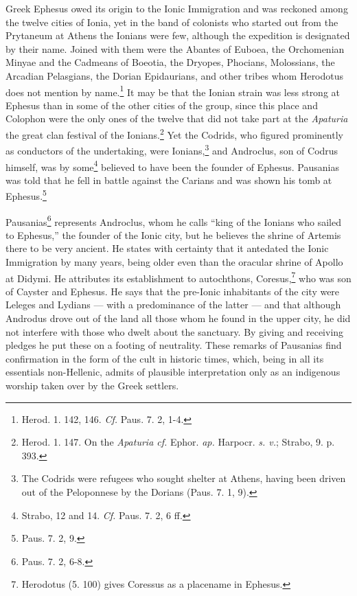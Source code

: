 \documentclass[a4paper, 12pt, oneside]{article}
\begin{document}
Greek Ephesus owed its origin to the Ionic Immigration and was reckoned among the twelve cities of Ionia, yet in the band of colonists who started out from the Prytaneum at Athens the Ionians were few, although the expedition is designated by their name. Joined with them were the Abantes of Euboea, the Orchomenian Minyae and the Cadmeans of Boeotia, the Dryopes, Phocians, Molossians, the Arcadian Pelasgians, the Dorian Epidaurians, and other tribes whom Herodotus does not mention by name.\footnote{Herod. 1. 142, 146. \emph{Cf.} Paus. 7. 2, 1-4.} It may be that the Ionian strain was less strong at Ephesus than in some of the other cities of the group, since this place and Colophon were the only ones of the twelve that did not take part at the \emph{Apaturia} the great clan festival of the Ionians.\footnote{Herod. 1. 147. On the \emph{Apaturia cf.} Ephor. \emph{ap.} Harpocr. \emph{s. v.}; Strabo, 9. p. 393.} Yet the Codrids, who figured prominently as conductors of the undertaking, were Ionians,\footnote{The Codrids were refugees who sought shelter at Athens, having been driven out of the Peloponnese by the Dorians (Paus. 7. 1, 9).} and Androclus, son of Codrus himself, was by some\footnote{Strabo, 12 and 14. \emph{Cf.} Paus. 7. 2, 6 ff.} believed to have been the founder of Ephesus. Pausanias was told that he fell in battle against the Carians and was shown his tomb at Ephesus.\footnote{Paus. 7. 2, 9.}

Pausanias\footnote{Paus. 7. 2, 6-8.} represents Androclus, whom he calls ``king of the Ionians who sailed to Ephesus,'' the founder of the Ionic city, but he believes the shrine of Artemis there to be very ancient. He states with certainty that it antedated the Ionic Immigration by many years, being older even than the oracular shrine of Apollo at Didymi. He attributes its establishment to autochthons, Coresus,\footnote{Herodotus (5. 100) gives Coressus as a placename in Ephesus.} who was son of Cayster and Ephesus. He says that the pre-Ionic inhabitants of the city were Leleges and Lydians --- with a predominance of the latter --- and that although Androdus drove out of the land all those whom he found in the upper city, he did not interfere with those who dwelt about the sanctuary. By giving and receiving pledges he put these on a footing of neutrality. These remarks of Pausanias find confirmation in the form of the cult in historic times, which, being in all its essentials non-Hellenic, admits of plausible interpretation only as an indigenous worship taken over by the Greek settlers.
\end{document}
